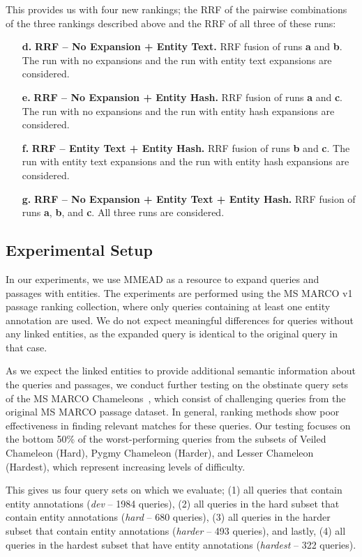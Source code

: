 This provides us with four new rankings; the RRF of the pairwise combinations of the three rankings described above and the RRF of all three of these runs:
\begin{itemize}
	\item[\textbf{d.}] \textbf{RRF -- No Expansion + Entity Text.} RRF fusion of runs \textbf{a} and \textbf{b}. The run with no expansions and the run with entity text expansions are considered.
	\item[\textbf{e.}] \textbf{RRF -- No Expansion + Entity Hash.} RRF fusion of runs \textbf{a} and \textbf{c}. The run with no expansions and the run with entity hash expansions are considered.
	\item[\textbf{f.}] \textbf{RRF -- Entity Text + Entity Hash.}  RRF fusion of runs \textbf{b} and \textbf{c}. The run with entity text expansions and the run with entity hash expansions are considered.
	\item[\textbf{g.}] \textbf{RRF -- No Expansion + Entity Text + Entity Hash.} RRF fusion of runs \textbf{a}, \textbf{b}, and \textbf{c}. All three runs are considered. 
\end{itemize}

\subsection{Experimental Setup}
In our experiments, we use MMEAD as a resource to expand queries and passages with entities. The experiments are performed using the MS MARCO v1 passage ranking collection, where only queries containing at least one entity annotation are used. We do not expect meaningful differences for queries without any linked entities, as the expanded query is identical to the original query in that case. 

As we expect the linked entities to provide additional semantic information about the queries and passages, we conduct further testing on the obstinate query sets of the MS MARCO Chameleons~\citep{chameleons}, which consist of challenging queries from the original MS MARCO passage dataset. In general, ranking methods show poor effectiveness in finding relevant matches for these queries. Our testing focuses on the bottom 50\% of the worst-performing queries from the subsets of Veiled Chameleon (Hard), Pygmy Chameleon (Harder), and Lesser Chameleon (Hardest), which represent increasing levels of difficulty. 

This gives us four query sets on which we evaluate; (1) all queries that contain entity annotations (\emph{dev} -- 1984 queries), (2) all queries in the hard subset that contain entity annotations (\emph{hard} -- 680 queries), (3) all queries in the harder subset that contain entity annotations (\emph{harder} -- 493 queries), and lastly, (4) all queries in the hardest subset that have entity annotations (\emph{hardest} -- 322 queries).

